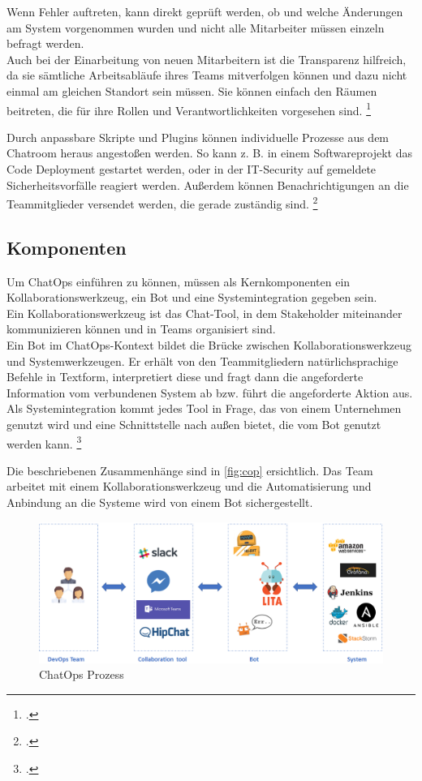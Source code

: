 Wenn Fehler auftreten, kann direkt geprüft werden, ob und welche Änderungen am System vorgenommen wurden und nicht alle Mitarbeiter müssen einzeln befragt werden.\\
Auch bei der Einarbeitung von neuen Mitarbeitern ist die Transparenz hilfreich, da sie sämtliche Arbeitsabläufe ihres Teams mitverfolgen können und dazu nicht einmal am gleichen Standort sein müssen. Sie können einfach den Räumen beitreten, die für ihre Rollen und Verantwortlichkeiten vorgesehen sind.
\footcites[Vgl.][o. \pno]{Sigler_2014_Chatops}[Vgl.][66]{Hand_2016_ChatOps}

Durch anpassbare Skripte und Plugins können individuelle Prozesse aus dem Chatroom heraus angestoßen werden. So kann z. B. in einem Softwareprojekt das Code Deployment gestartet werden, oder in der IT-Security auf gemeldete Sicherheitsvorfälle reagiert werden. Außerdem können Benachrichtigungen an die Teammitglieder versendet werden, die gerade zuständig sind.
\footcite[Vgl.][o. \pno]{Sigler_2014_Chatops}

\subsection{Komponenten}
Um ChatOps einführen zu können, müssen als Kernkomponenten ein Kollaborationswerkzeug, ein Bot und eine Systemintegration gegeben sein.\\
Ein Kollaborationswerkzeug ist das Chat-Tool, in dem Stakeholder miteinander kommunizieren können und in Teams organisiert sind.\\
Ein Bot im ChatOps-Kontext bildet die Brücke zwischen Kollaborationswerkzeug und Systemwerkzeugen. Er erhält von den Teammitgliedern natürlichsprachige Befehle in Textform, interpretiert diese und fragt dann die angeforderte Information vom verbundenen System ab bzw. führt die angeforderte Aktion aus.\\
Als Systemintegration kommt jedes Tool in Frage, das von einem Unternehmen genutzt wird und eine Schnittstelle nach außen bietet, die vom Bot genutzt werden kann.
\footcite[Vgl.][o. \pno]{Zyane_2017_ChatOps}


Die beschriebenen Zusammenhänge sind in \autoref{fig:cop} ersichtlich. Das Team arbeitet mit einem Kollaborationswerkzeug und die Automatisierung und Anbindung an die Systeme wird von einem Bot sichergestellt.

\begin{figure}[H]
  \centering
  \includegraphics[width=\textwidth]{Anhang/cop}
  \caption{ChatOps Prozess}
\label{fig:cop}
\end{figure}


